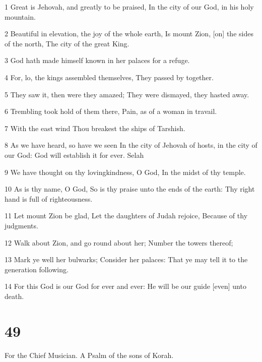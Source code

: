 \par 1 Great is Jehovah, and greatly to be praised, In the city of our God, in his holy mountain.
\par 2 Beautiful in elevation, the joy of the whole earth, Is mount Zion, [on] the sides of the north, The city of the great King.
\par 3 God hath made himself known in her palaces for a refuge.
\par 4 For, lo, the kings assembled themselves, They passed by together.
\par 5 They saw it, then were they amazed; They were dismayed, they hasted away.
\par 6 Trembling took hold of them there, Pain, as of a woman in travail.
\par 7 With the east wind Thou breakest the ships of Tarshish.
\par 8 As we have heard, so have we seen In the city of Jehovah of hosts, in the city of our God: God will establish it for ever. Selah
\par 9 We have thought on thy lovingkindness, O God, In the midst of thy temple.
\par 10 As is thy name, O God, So is thy praise unto the ends of the earth: Thy right hand is full of righteousness.
\par 11 Let mount Zion be glad, Let the daughters of Judah rejoice, Because of thy judgments.
\par 12 Walk about Zion, and go round about her; Number the towers thereof;
\par 13 Mark ye well her bulwarks; Consider her palaces: That ye may tell it to the generation following.
\par 14 For this God is our God for ever and ever: He will be our guide [even] unto death.

\chapter{49}

\par For the Chief Musician. A Psalm of the sons of Korah.

